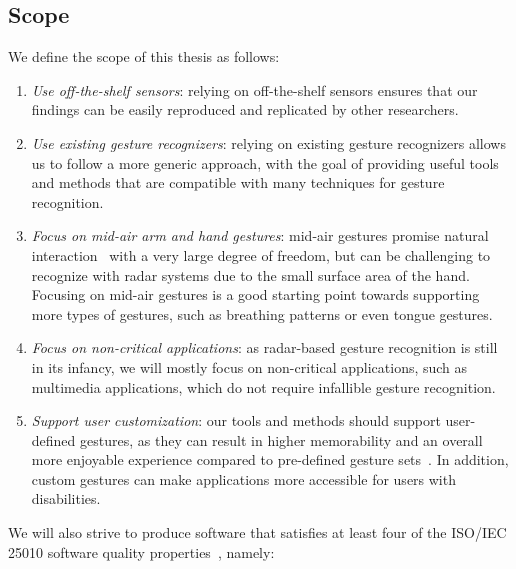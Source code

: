 \newpage
\subsection{Scope}
We define the scope of this thesis as follows:
\begin{enumerate}[label=\textit{S\arabic*}]
    \item \textit{Use off-the-shelf sensors}: relying on off-the-shelf sensors ensures that our findings can be easily reproduced and replicated by other researchers.
    \item \textit{Use existing gesture recognizers}: relying on existing gesture recognizers allows us to follow a more generic approach, with the goal of providing useful tools and methods that are compatible with many techniques for gesture recognition.
    \item \textit{Focus on mid-air arm and hand gestures}: mid-air gestures promise natural interaction~\cite{Wigdor:2011} with a very large degree of freedom, but can be challenging to recognize with radar systems due to the small surface area of the hand. Focusing on mid-air gestures is a good starting point towards supporting more types of gestures, such as breathing patterns or even tongue gestures.
    \item \textit{Focus on non-critical applications}: as radar-based gesture recognition is still in its infancy, we will mostly focus on non-critical applications, such as multimedia applications, which do not require infallible gesture recognition.
    \item \textit{Support user customization}: our tools and methods should support user-defined gestures, as they can result in higher memorability and an overall more enjoyable experience compared to pre-defined gesture sets~\cite{Nacenta:2013}. In addition, custom gestures can make applications more accessible for users with disabilities.
\end{enumerate}
We will also strive to produce software that satisfies at least four of the ISO/IEC 25010 software quality properties~\cite{iso25010}, namely:
